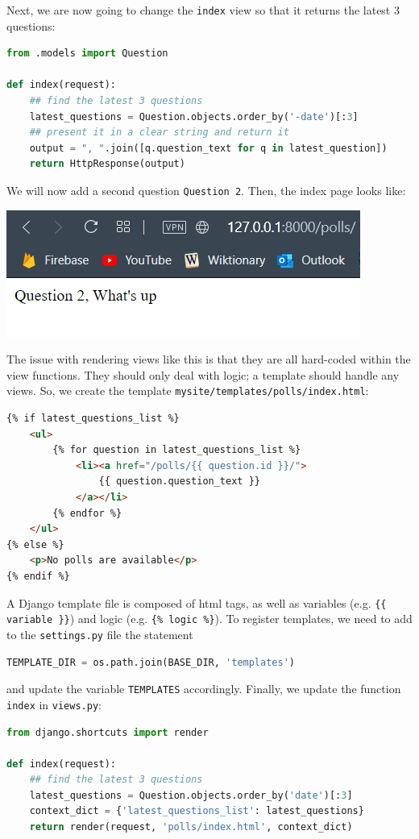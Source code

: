\documentclass[a4paper, openany]{memoir}
\begin{document}
    \noindent Next, we are now going to change the \texttt{index} view so that it returns the latest 3 questions:
\begin{lstlisting}[language=python]
from .models import Question

def index(request):
    ## find the latest 3 questions
    latest_questions = Question.objects.order_by('-date')[:3]
    ## present it in a clear string and return it
    output = ", ".join([q.question_text for q in latest_question])
    return HttpResponse(output)
\end{lstlisting}
    We will now add a second question \texttt{Question 2}. Then, the index page looks like:
    \begin{center}
        \includegraphics[scale=0.7]{src/Django7.PNG}
    \end{center}
    The issue with rendering views like this is that they are all hard-coded within the view functions. They should only deal with logic; a template should handle any views. So, we create the template \texttt{mysite/templates/polls/index.html}:
\begin{lstlisting}[language=html]
{% if latest_questions_list %}
    <ul>
        {% for question in latest_questions_list %}
            <li><a href="/polls/{{ question.id }}/">
                {{ question.question_text }}
            </a></li>
        {% endfor %}
    </ul>
{% else %}
    <p>No polls are available</p>
{% endif %}
\end{lstlisting}
    A Django template file is composed of html tags, as well as variables (e.g. \texttt{\{\{  variable \}\}}) and logic (e.g. \texttt{\{\% logic \%\}}). To register templates, we need to add to the \texttt{settings.py} file the statement 
\begin{lstlisting}[language=python]
TEMPLATE_DIR = os.path.join(BASE_DIR, 'templates')
\end{lstlisting}
    and update the variable \texttt{TEMPLATES} accordingly. Finally, we update the function \texttt{index} in \texttt{views.py}:
\begin{lstlisting}[language=python]
from django.shortcuts import render

def index(request):
    ## find the latest 3 questions
    latest_questions = Question.objects.order_by('date')[:3]
    context_dict = {'latest_questions_list': latest_questions}
    return render(request, 'polls/index.html', context_dict)
\end{lstlisting}
\end{document}
